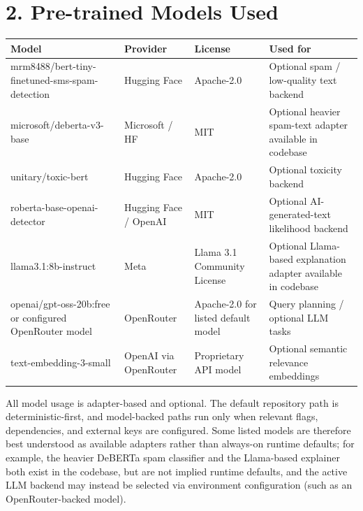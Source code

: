 \documentclass[10pt,a4paper]{article}
\newcommand{\modelid}[1]{{\ttfamily\scriptsize #1}}
\begin{document}
\section{2. Pre-trained Models Used}
\begin{tabularx}{\textwidth}{@{}p{}p{}p{}X@{}}
\toprule
\textbf{Model} & \textbf{Provider} & \textbf{License} & \textbf{Used for} \\
\midrule
\modelid{mrm8488/\allowbreak bert-tiny-\allowbreak finetuned-\allowbreak sms-spam-\allowbreak detection} & Hugging Face & Apache-2.0 & Optional spam / low-quality text backend \\
\modelid{microsoft/deberta-v3-base} & Microsoft / HF & MIT & Optional heavier spam-text adapter available in codebase \\
\modelid{unitary/toxic-bert} & Hugging Face & Apache-2.0 & Optional toxicity backend \\
\modelid{roberta-base-\allowbreak openai-\allowbreak detector} & Hugging Face / OpenAI & MIT & Optional AI-generated-text likelihood backend \\
\modelid{llama3.1:8b-instruct} & Meta & Llama 3.1 Community License & Optional Llama-based explanation adapter available in codebase \\
\modelid{openai/\allowbreak gpt-oss-20b:free} or configured OpenRouter model & OpenRouter & Apache-2.0 for listed default model & Query planning / optional LLM tasks \\
\modelid{text-embedding-3-small} & OpenAI via OpenRouter & Proprietary API model & Optional semantic relevance embeddings \\
\bottomrule
\end{tabularx}

All model usage is adapter-based and optional. The default repository path is deterministic-first, and model-backed paths run only when relevant flags, dependencies, and external keys are configured. Some listed models are therefore best understood as available adapters rather than always-on runtime defaults; for example, the heavier DeBERTa spam classifier and the Llama-based explainer both exist in the codebase, but are not implied runtime defaults, and the active LLM backend may instead be selected via environment configuration (such as an OpenRouter-backed model).
\end{document}
